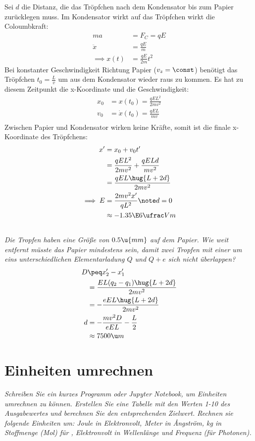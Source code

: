\documentclass[ex,minted,hatbasis]{exercise_4.0}
\begin{document}
Sei $d$ die Distanz, die das Tröpfchen nach dem Kondensator bis zum Papier zurücklegen muss. Im Kondensator wirkt auf das Tröpfchen wirkt die Coloumbkraft:
\begin{align*}
    m a &= F_C = q E\\
    \ddot x &= \frac{qE}{m}\\
    \implies x(t) &= \frac{qE}{2m} t^2
\end{align*}
Bei konstanter Geschwindigkeit Richtung Papier ($v_z = \const$) benötigt das Tröpfchen $t_0 = \frac{L}{v}$ um aus dem Kondensator wieder raus zu kommen.
Es hat zu diesem Zeitpunkt die x-Koordinate und die Geschwindigkeit:
\begin{align*}
    x_0 &= x(t_0) = \frac{q E L^2}{2 m v^2}\\
    v_0 &= \dot x(t_0) = \frac{q E L}{m v}\\
\end{align*}
Zwischen Papier und Kondensator wirken keine Kräfte, somit ist die finale x-Koordinate des Tröpfchens:
\begin{align*}
    x' &= x_0 + v_0 t'\\ 
     &= \frac{q E L^2}{2 m v^2} + \frac{q E L d}{m v^2}\\
     &= \frac{q E L \hug{L + 2d}}{2m v^2}\\
     \implies E &= \frac{2m v^2 x'}{q L^2} \note d=0\\
     &\approx -1.35 \E6\ufrac Vm
\end{align*}


\subsection{}
{\it Die Tropfen haben eine Größe von $0.5 \u{mm}$ auf dem Papier. Wie weit entfernt müsste das Papier mindestens sein, damit zwei Tropfen mit einer um eins unterschiedlichen Elementarladung $Q$ und $Q + e$ sich nicht überlappen?}\vspace{2ex}
\begin{align*}
    D &\peq x_2' - x_1' \\
    &= \frac{E L (q_2 - q_1)\hug{L + 2d}}{2m v^2}\\
    &= -\frac{e E L\hug{L + 2d}}{2m v^2}\\
    d &= -\frac{m v^2 D}{e E L} - \frac L2\\
    &\approx 7500 \u m
\end{align*}

\section{Einheiten umrechnen}
\textit{Schreiben Sie ein kurzes Programm oder Jupyter Notebook, um Einheiten umrechnen zu können. Erstellen
Sie eine Tabelle mit den Werten 1-10 des Ausgabewertes und berechnen Sie den entsprechenden Zielwert. Rechnen sie folgende Einheiten um: Joule in Elektronvolt, Meter in Ångström, kg in Stoffmenge (Mol) für , 
Elektronvolt in Wellenlänge und Frequenz (für Photonen).}\vspace{1ex}

\end{document}
